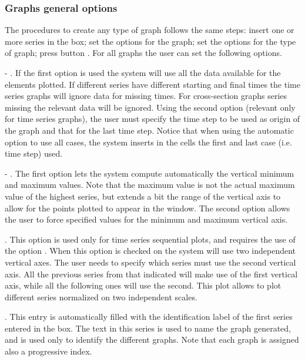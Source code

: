 \documentclass [11pt,a4paper] {book}
\begin{document}
\subsubsection{Graphs general options}

The procedures to create any type of graph follows the same steps: insert one or more series in the  box; set the options for the graph; set the options for the type of graph; press button . For all graphs the user can set the following options.

 - . If the first option is used the system will use all the data available for the elements plotted. If different series have different starting and final times the time series graphs will ignore data for missing times. For cross-section graphs series missing the relevant data will be ignored. Using the second option (relevant only for time series graphs), the user must specify the time step to be used as origin of the graph and that for the last time step. Notice that when using the automatic option to use all cases, the system inserts in the cells the first and last case (i.e. time step) used.

 - . The first option lets the system compute automatically the vertical minimum and maximum values. Note that the maximum value is not the actual maximum value of the highest series, but extends a bit the range of the vertical axis to allow for the points plotted to appear in the window. The second option allows the user to force specified values for the minimum and maximum vertical axis.

. This option is used only for time series sequential plots, and requires the use of the option . When this option is checked on the system will use two independent vertical axes. The user needs to specify which series must use the second vertical axis. All the previous series from that indicated will make use of the first vertical axis, while all the following ones will use the second. This plot allows to plot different series normalized on two independent scales.

. This entry is automatically filled with the identification label of the first series entered in the  box. The text in this series is used to name the graph generated, and is used only to identify the different graphs. Note that each graph is assigned also a progressive index.
\end{document}

